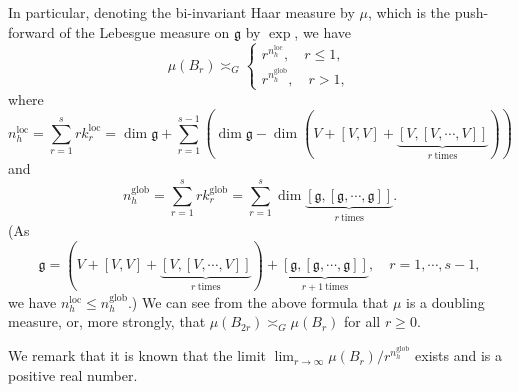 \documentclass[11pt,reqno]{amsart}
\newcommand{\1}{\mathbf 1}
\begin{document}
In particular, denoting the bi-invariant Haar measure by $\mu$, which is the push-forward of the Lebesgue measure on $\mathfrak{g}$ by $\exp$, we have
\[
\mu\left(B_r\right)\asymp_G
\begin{cases}
r^{n^{\mathrm{loc}}_h},\quad r\le 1,\\
r^{n^{\mathrm{glob}}_h},\quad r>1,
\end{cases}
\]
where
\[
n^{\mathrm{loc}}_h=\sum_{r=1}^s rk_r^{\mathrm{loc}}=\dim\mathfrak{g}+\sum_{r=1}^{s-1}\left(\dim\mathfrak{g}-\dim\left(V+\left[V,V\right]+\underbrace{\left[V,\left[V,\cdots,V\right]\right]}_{r~\mathrm{times}}\right)\right)
\]
and
\[
n^{\mathrm{glob}}_h=\sum_{r=1}^s rk_r^{\mathrm{glob}}=\sum_{r=1}^s\dim\underbrace{\left[\mathfrak{g},\left[\mathfrak{g},\cdots,\mathfrak{g}\right]\right]}_{r~\mathrm{times}}.
\]
(As
\[
\mathfrak{g}=\left(V+\left[V,V\right]+\underbrace{\left[V,\left[V,\cdots,V\right]\right]}_{r~\mathrm{times}}\right)+\underbrace{\left[\mathfrak{g},\left[\mathfrak{g},\cdots,\mathfrak{g}\right]\right]}_{r+1~\mathrm{times}},\quad r=1,\cdots,s-1,
\]
we have $n_h^{\mathrm{loc}}\le n_h^{\mathrm{glob}}$.) We can see from the above formula that $\mu$ is a doubling measure, or, more strongly, that $\mu\left(B_{2r}\right)\asymp_G \mu\left(B_r\right)$ for all $r \ge 0$.

We remark that it is known \cite[Theorem 1.1]{breuillard2014geometry} that the limit $\lim_{r\to\infty}\mu\left(B_r\right)/r^{n_h^{\mathrm{glob}}}$ exists and is a positive real number.

\end{document}
